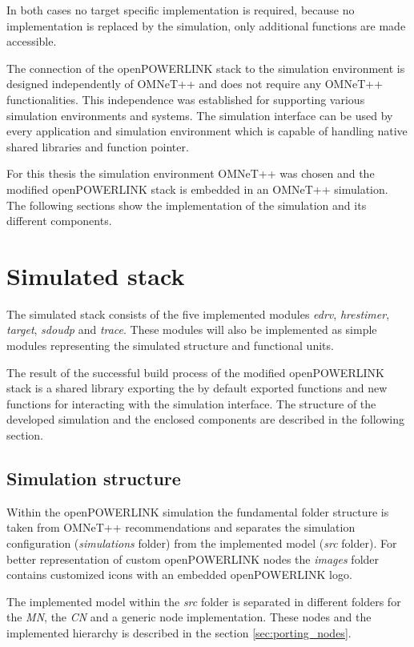 In both cases no target specific implementation is required, because no implementation is replaced by the simulation, only additional functions are made accessible.

The connection of the openPOWERLINK stack to the simulation environment is designed independently of OMNeT++ and does not require any OMNeT++ functionalities.
This independence was established for supporting various simulation environments and systems.
The simulation interface can be used by every application and simulation environment which is capable of handling native shared libraries and function pointer.

For this thesis the simulation environment OMNeT++ was chosen and the modified openPOWERLINK stack is embedded in an OMNeT++ simulation.
The following sections show the implementation of the simulation and its different components.

\section{Simulated stack}
\label{sec:porting_stack}
The simulated stack consists of the five implemented modules \emph{edrv}, \emph{hrestimer}, \emph{target}, \emph{sdoudp} and \emph{trace}.
These modules will also be implemented as simple modules representing the simulated structure and functional units.

The result of the successful build process of the modified openPOWERLINK stack is a shared library exporting the by default exported functions and new functions for interacting with the simulation interface.
The structure of the developed simulation and the enclosed components are described in the following section.

\subsection{Simulation structure}
\label{sec:porting_stack_simstructure}
Within the openPOWERLINK simulation the fundamental folder structure is taken from OMNeT++ recommendations and separates the simulation configuration (\emph{simulations} folder) from the implemented model (\emph{src} folder).
For better representation of custom openPOWERLINK nodes the \emph{images} folder contains customized icons with an embedded openPOWERLINK logo.

The implemented model within the \emph{src} folder is separated in different folders for the \emph{MN}, the \emph{CN} and a generic node implementation.
These nodes and the implemented hierarchy is described in the section \ref{sec:porting_nodes}.

